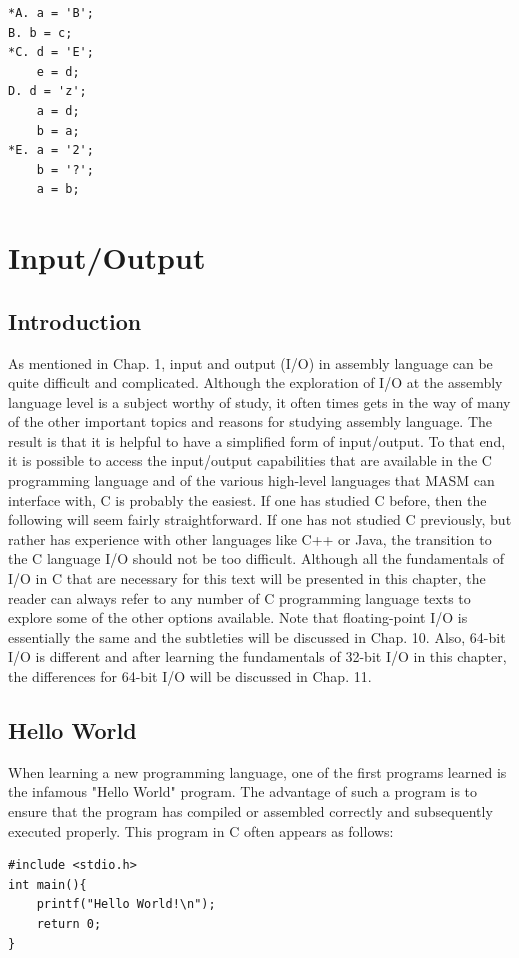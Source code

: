 \documentclass[10pt]{book}
\begin{document}
\begin{verbatim}
*A. a = 'B';
B. b = c;
*C. d = 'E';
    e = d;
D. d = 'z';
    a = d;
    b = a;
*E. a = '2';
    b = '?';
    a = b;
\end{verbatim}

\chapter{Input/Output}
\section{Introduction}
As mentioned in Chap. 1, input and output (I/O) in assembly language can be quite difficult and complicated. Although the exploration of I/O at the assembly language level is a subject worthy of study, it often times gets in the way of many of the other important topics and reasons for studying assembly language. The result is that it is helpful to have a simplified form of input/output. To that end, it is possible to access the input/output capabilities that are available in the C programming language and of the various high-level languages that MASM can interface with, C is probably the easiest. If one has studied C before, then the following will seem fairly straightforward. If one has not studied C previously, but rather has experience with other languages like C++ or Java, the transition to the C language I/O should not be too difficult. Although all the fundamentals of I/O in C that are necessary for this text will be presented in this chapter, the reader can always refer to any number of C programming language texts to explore some of the other options available. Note that floating-point I/O is essentially the same and the subtleties will be discussed in Chap. 10. Also, 64-bit I/O is different and after learning the fundamentals of 32-bit I/O in this chapter, the differences for 64-bit I/O will be discussed in Chap. 11.

\section{Hello World}
When learning a new programming language, one of the first programs learned is the infamous "Hello World" program. The advantage of such a program is to ensure that the program has compiled or assembled correctly and subsequently executed properly. This program in C often appears as follows:

\begin{verbatim}
#include <stdio.h>
int main(){
    printf("Hello World!\n");
    return 0;
}
\end{verbatim}
\end{document}
